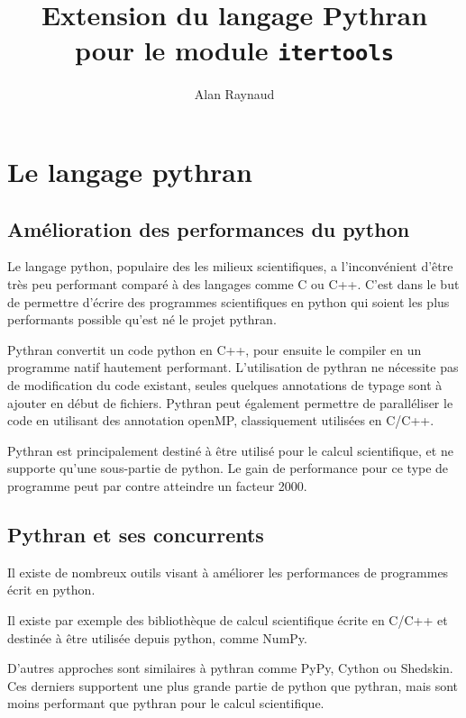\documentclass[a4paper]{article}
\title{Extension du langage Pythran pour le module \texttt{itertools}}
\author{Alan Raynaud}
\date{}
\begin{document}

\maketitle   


\clearpage

\section*{Le langage pythran}

\subsection*{Amélioration des performances du python}

Le langage python, populaire des les milieux scientifiques, a
l'inconvénient d'être très peu performant comparé à des langages comme
C ou C++. C'est dans le but de permettre d'écrire des programmes
scientifiques en python qui soient les plus performants possible
qu'est né le projet pythran.

Pythran convertit un code python en C++, pour ensuite le compiler en
un programme natif hautement performant. L'utilisation de pythran ne
nécessite pas de modification du code existant, seules quelques
annotations de typage sont à ajouter en début de fichiers. Pythran
peut également permettre de paralléliser le code en utilisant des
annotation openMP, classiquement utilisées en C/C++.

Pythran est principalement destiné à être utilisé pour le calcul
scientifique, et ne supporte qu'une sous-partie de python. Le gain de
performance pour ce type de programme peut par contre atteindre un
facteur 2000.

\subsection*{Pythran et ses concurrents}

Il existe de nombreux outils visant à améliorer les performances de
programmes écrit en python.

Il existe par exemple des bibliothèque de calcul scientifique écrite
en C/C++ et destinée à être utilisée depuis python, comme NumPy.

D'autres approches sont similaires à pythran comme PyPy, Cython ou
Shedskin. Ces derniers supportent une plus grande partie de python que
pythran, mais sont moins performant que pythran pour le calcul
scientifique.
\end{document}

